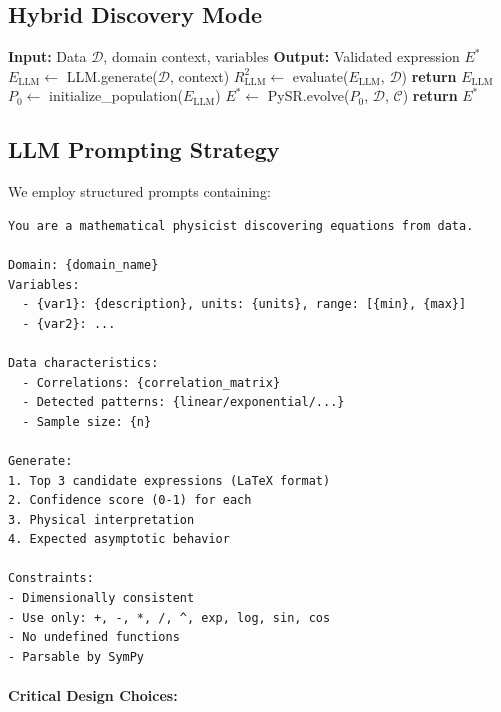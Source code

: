 \documentclass[twoside,11pt]{article}
\begin{document}
\subsection{Hybrid Discovery Mode}

\begin{algorithm}[htbp]
\caption{LLM-Guided Symbolic Discovery}
\label{alg:hybrid}
\begin{algorithmic}[1]
\STATE \textbf{Input:} Data $\mathcal{D}$, domain context, variables
\STATE \textbf{Output:} Validated expression $E^*$
\STATE
\STATE $E_{\text{LLM}} \gets$ LLM.generate($\mathcal{D}$, context)
\STATE $R^2_{\text{LLM}} \gets$ evaluate($E_{\text{LLM}}$, $\mathcal{D}$)
    \STATE \textbf{return} $E_{\text{LLM}}$ 
\ELSE
    \STATE $P_0 \gets$ initialize\_population($E_{\text{LLM}}$) 
    \STATE $E^* \gets$ PySR.evolve($P_0$, $\mathcal{D}$, $\mathcal{C}$)
    \STATE \textbf{return} $E^*$ 
\ENDIF
\end{algorithmic}
\end{algorithm}

\subsection{LLM Prompting Strategy}

We employ structured prompts containing:

\begin{small}
\begin{verbatim}
You are a mathematical physicist discovering equations from data.

Domain: {domain_name}
Variables:
  - {var1}: {description}, units: {units}, range: [{min}, {max}]
  - {var2}: ...

Data characteristics:
  - Correlations: {correlation_matrix}
  - Detected patterns: {linear/exponential/...}
  - Sample size: {n}

Generate:
1. Top 3 candidate expressions (LaTeX format)
2. Confidence score (0-1) for each
3. Physical interpretation
4. Expected asymptotic behavior

Constraints:
- Dimensionally consistent
- Use only: +, -, *, /, ^, exp, log, sin, cos
- No undefined functions
- Parsable by SymPy
\end{verbatim}
\end{small}

\paragraph{Critical Design Choices:}
\end{document}
